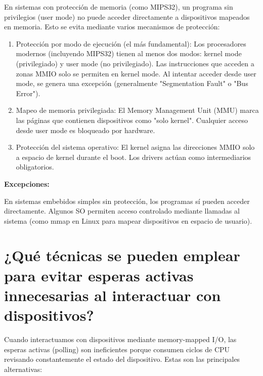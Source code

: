 \documentclass{article}
\begin{document}
En sistemas con protección de memoria (como MIPS32), un programa sin privilegios (user mode) no puede acceder directamente a dispositivos mapeados en memoria.  Esto se evita mediante varios mecanismos de protección:

\begin{enumerate}
\item Protección por modo de ejecución (el más fundamental): Los procesadores modernos (incluyendo MIPS32) tienen al menos dos modos: kernel mode (privilegiado) y user mode (no privilegiado). Las instrucciones que acceden a zonas MMIO solo se permiten en kernel mode. Al intentar acceder desde user mode, se genera una excepción (generalmente "Segmentation Fault" o "Bus Error").
\item Mapeo de memoria privilegiada: El Memory Management Unit (MMU) marca las páginas que contienen dispositivos como "solo kernel". Cualquier acceso desde user mode es bloqueado por hardware.
\item Protección del sistema operativo: El kernel asigna las direcciones MMIO solo a espacio de kernel durante el boot. Los drivers actúan como intermediarios obligatorios.
\end{enumerate}

\textbf{Excepciones:}

En sistemas embebidos simples sin protección, los programas sí pueden acceder directamente. Algunos SO permiten acceso controlado mediante llamadas al sistema (como mmap en Linux para mapear dispositivos en espacio de usuario).

\section{¿Qué técnicas se pueden emplear para evitar esperas activas innecesarias al interactuar con dispositivos?}

Cuando interactuamos con dispositivos mediante memory-mapped I/O, las esperas activas (polling) son ineficientes porque consumen ciclos de CPU revisando constantemente el estado del dispositivo. Estas son las principales alternativas:
\end{document}
